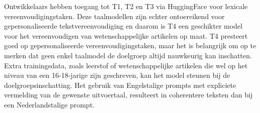 \medspace

Ontwikkelaars hebben toegang tot T1, T2 en T3 via HuggingFace voor lexicale vereenvoudigingstaken. Deze taalmodellen zijn echter ontoereikend voor gepersonaliseerde tekstvereenvoudiging en daarom is T4 een geschikter model voor het vereenvoudigen van wetenschappelijke artikelen op maat. T4 presteert goed op gepersonaliseerde vereenvoudigingstaken, maar het is belangrijk om op te merken dat geen enkel taalmodel de doelgroep altijd nauwkeurig kan inschatten. Extra trainingsdata, zoals leerstof of wetenschappelijke artikelen die wel op het niveau van een 16-18-jarige zijn geschreven, kan het model steunen bij de doelgroepsinschatting. Het gebruik van Engelstalige prompts met expliciete vermelding van de gewenste uitvoertaal, resulteert in coherentere teksten dan bij een Nederlandstalige prompt.